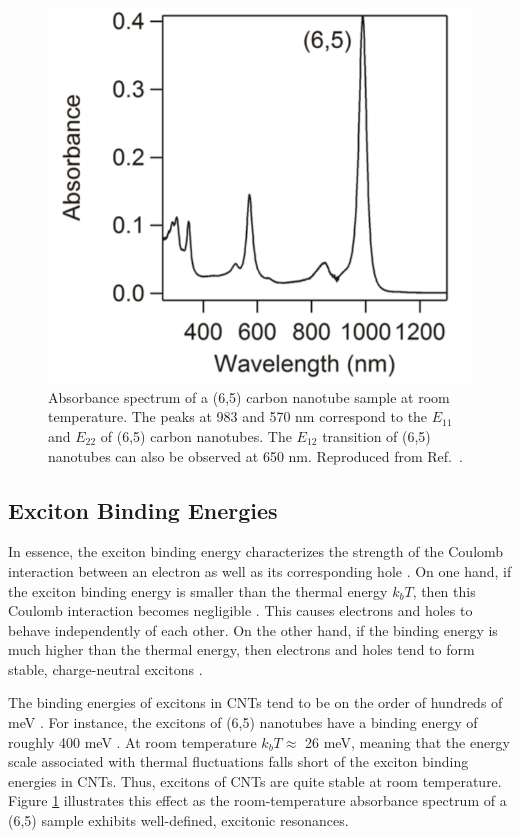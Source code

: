 \begin{figure}[ht]
	\centering
	\includegraphics[scale=0.62]{images/chapter_optical_props/cnt_absorbance_yota}
	\caption{Absorbance spectrum of a (6,5) carbon nanotube sample at room temperature. The peaks at 983 and 570 nm correspond to the $E_{11}$ and $E_{22}$ of (6,5) carbon nanotubes. The $E_{12}$ transition of (6,5) nanotubes can also be observed at 650 nm. Reproduced from Ref.\ \cite{ichinose2017extraction}. }
	\label{fig:cnt_abs_yota}
\end{figure}

\subsection{Exciton Binding Energies}

In essence, the exciton binding energy characterizes the strength of the Coulomb interaction between an electron as well as its corresponding hole \cite{valkunas2006exciton}. On one hand, if the exciton binding energy is smaller than the thermal energy $k_b T$, then this Coulomb interaction becomes negligible \cite{valkunas2006exciton}. This causes electrons and holes to behave independently of each other. On the other hand, if the binding energy is much higher than the thermal energy, then electrons and holes tend to form stable, charge-neutral excitons \cite{valkunas2006exciton}.

The binding energies of excitons in CNTs tend to be on the order of hundreds of meV \cite{wang2005optical}. For instance, the excitons of (6,5) nanotubes have a binding energy of roughly 400 meV \cite{wang2005optical}. At room temperature $k_b T \approx$ 26 meV, meaning that the energy scale associated with thermal fluctuations falls short of the exciton binding energies in CNTs. Thus, excitons of CNTs are quite stable at room temperature. Figure \ref{fig:cnt_abs_yota} illustrates this effect as the room-temperature absorbance spectrum of a (6,5) sample exhibits well-defined, excitonic resonances.


